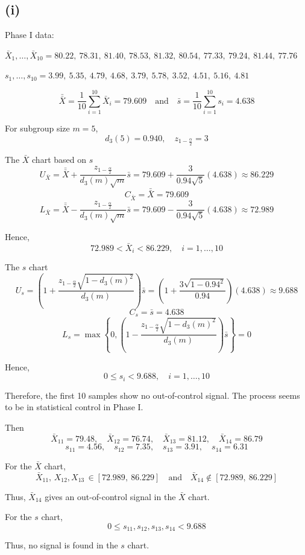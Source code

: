 \documentclass[a4paper, 12pt]{article}  %
\begin{document}
\subsection*{(i)}

Phase I data:

$\bar X_1,\ldots,\bar X_{10}=80.22,\ 78.31,\ 81.40,\ 78.53,\ 81.32,\ 80.54,\ 77.33,\ 79.24,\ 81.44,\ 77.76$

$s_1,\ldots,s_{10}=3.99,\ 5.35,\ 4.79,\ 4.68,\ 3.79,\ 5.78,\ 3.52,\ 4.51,\ 5.16,\ 4.81$

$$
\bar{\bar X}=\frac{1}{10}\sum_{i=1}^{10}\bar X_i=79.609
\quad\text{and}\quad
\bar s=\frac{1}{10}\sum_{i=1}^{10}s_i=4.638
$$

For subgroup size \(m=5\),
$$
d_3(5)=0.940,\quad z_{1-\frac{\alpha}{2}}=3
$$

The \(\bar X\) chart based on \(s\)
$$
U_{\bar X}=\bar{\bar X}+\frac{z_{1-\frac{\alpha}{2}}}{d_3(m)\sqrt{m}}\bar s=79.609+\frac{3}{0.94\sqrt{5}}(4.638)\approx 86.229
$$
$$
C_{\bar X}=\bar{\bar X}=79.609
$$
$$
L_{\bar X}=\bar{\bar X}-\frac{z_{1-\frac{\alpha}{2}}}{d_3(m)\sqrt{m}}\bar s=79.609-\frac{3}{0.94\sqrt{5}}(4.638)\approx 72.989
$$

Hence,
$$
72.989<\bar X_i<86.229,\quad i=1,\ldots,10
$$

The \(s\) chart
$$
U_s=\left(1+\frac{z_{1-\frac{\alpha}{2}}\sqrt{1-d_3(m)^2}}{d_3(m)}\right)\bar s=\left(1+\frac{3\sqrt{1-0.94^2}}{0.94}\right)(4.638)\approx 9.688$$
$$
C_s=\bar s=4.638
$$
$$
L_s=\max\left\{0,\left(1-\frac{z_{1-\frac{\alpha}{2}}\sqrt{1-d_3(m)^2}}{d_3(m)}\right)\bar s\right\}=0
$$

Hence,
$$
0\le s_i<9.688,\quad i=1,\ldots,10
$$

Therefore, 
the first 10 samples show no out-of-control signal.
The process seems to be in statistical control in Phase I.

Then
$$
\bar X_{11}=79.48,\quad
\bar X_{12}=76.74,\quad
\bar X_{13}=81.12,\quad
\bar X_{14}=86.79
$$
$$
s_{11}=4.56,\quad
s_{12}=7.35,\quad
s_{13}=3.91,\quad
s_{14}=6.31
$$

For the \(\bar X\) chart,
$$
\bar X_{11}, \,X_{12}, X_{13}\,\in[72.989,\ 86.229]
\quad \text{and}\quad
\bar X_{14}\notin[72.989,\ 86.229]
$$

Thus, $\bar X_{14}$ gives an out-of-control signal in the \(\bar X\) chart.

For the \(s\) chart,
$$
0\le s_{11},s_{12},s_{13},s_{14}<9.688
$$

Thus, no signal is found in the \(s\) chart.
\end{document}
